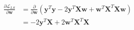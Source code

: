 \newcommand{\matrix}[1]{\mathbf{#1}}
\newcommand{\vector}[1]{\mathbf{#1}}
\newcommand{\X}{\matrix{X}}
\newcommand{\y}{\vector{y}}
\newcommand{\w}{\vector{w}}
\begin{align*}
\frac{\partial \mathcal{L}_{LS}}{\partial \w} &= \frac{\partial}{\partial \w} \left( \y^T\y - 2\y^T\X\w + \w^T\X^T\X\w \right) \\
&= - 2\y^T\X + 2\w^T\X^T\X \\
\end{align*}
